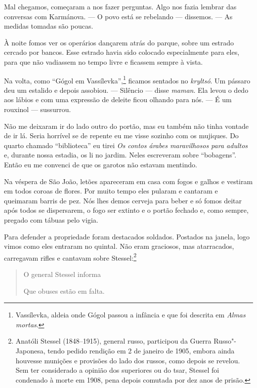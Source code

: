 Mal chegamos, começaram a nos fazer perguntas. Algo nos fazia lembrar
das conversas com Karmánova. --- O povo está se rebelando --- dissemos.
--- As medidas tomadas são poucas.

À noite fomos ver os operários dançarem atrás do parque, sobre um
estrado cercado por bancos. Esse estrado havia sido colocado
especialmente para eles, para que não vadiassem no tempo livre e
ficassem sempre à vista.

Na volta, como ``Gógol em Vassílevka'',\footnote{Vassílevka, aldeia onde
  Gógol passou a infância e que foi descrita em \emph{Almas mortas}.}
ficamos sentados no \emph{kryltsó}. Um pássaro deu um estalido e depois
assobiou. --- Silêncio --- disse \emph{maman}. Ela levou o dedo aos
lábios e com uma expressão de deleite ficou olhando para nós. --- É um
rouxinol --- sussurrou.

Não me deixaram ir do lado outro do portão, mas eu também não tinha %
vontade de ir lá. Seria horrível se de repente eu me visse sozinho com
os mujiques. Do quarto chamado ``biblioteca'' eu tirei \emph{Os contos
árabes maravilhosos para adultos} e, durante nossa estadia, os li no
jardim. Neles escreveram sobre ``bobagens''. Então eu me convenci de que
os garotos não estavam mentindo.

Na véspera de São João, letões apareceram em casa com fogos e galhos e
vestiram em todos coroas de flores. Por muito tempo eles pularam e
cantaram e queimaram barris de pez. Nós lhes demos cerveja para beber e %
só fomos deitar após todos se dispersarem, o fogo ser extinto e o portão
fechado e, como sempre, pregado com tábuas pelo vigia.

Para defender a propriedade foram destacados soldados. Postados na
janela, logo vimos como eles entraram no quintal. Não eram graciosos,
mas atarracados, carregavam rifles e cantavam sobre Stessel:\footnote{Anatóli
  Stessel (1848--1915), general russo, participou da Guerra
  Russo"-Japonesa, tendo pedido rendição em 2 de janeiro de 1905, embora
  ainda houvesse munições e provisões do lado dos russos, como depois se
  revelou. Sem ter considerado a opinião dos superiores ou do tsar,
  Stessel foi condenado à morte em 1908, pena depois comutada por dez
  anos de prisão.}

\begin{quotation}
O general Stessel informa

Que obuses estão em falta.
\end{quotation}

